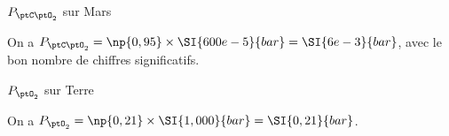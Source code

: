 

\begin{enonce}
$P_{\ptC\ptO_2}$ sur Mars
\end{enonce}


\begin{corrige}
On a $P_{\ptC\ptO_2}=\np{0,95} \times \SI{600e-5}{bar} = \SI{6e-3}{bar}$, avec le bon nombre de chiffres significatifs.
\end{corrige}




\begin{enonce}
$P_{\ptO_2}$ sur Terre
\end{enonce}


\begin{corrige}
On a $P_{\ptO_2}=\np{0,21} \times \SI{1,000}{bar}=\SI{0,21}{bar}$.
\end{corrige}


\finEntrainement







\hauteurLargeurCadreReponse		{8mm}{5cm}
\initialisationEntrainement


